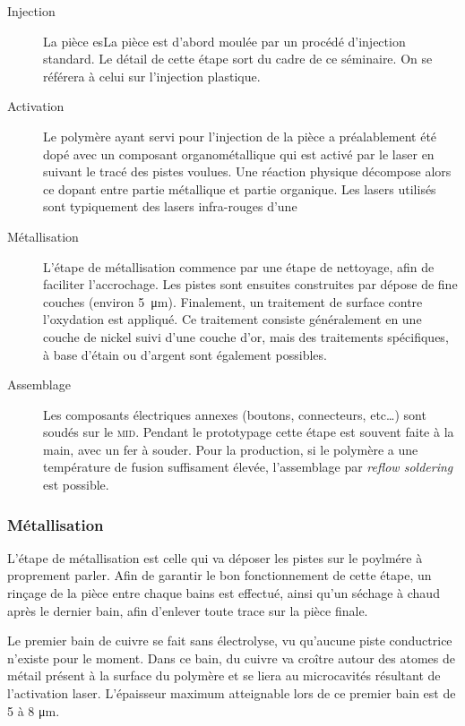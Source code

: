 \begin{description}
    \item[Injection] La pièce esLa pièce est d'abord moulée par un procédé d'injection standard.
        Le détail de cette étape sort du cadre de ce séminaire.
        On se référera à celui sur l'injection plastique.

    \item[Activation] Le polymère ayant servi pour l'injection de la pièce a préalablement été dopé avec un composant organométallique qui est activé par le laser en suivant le tracé des pistes voulues.
        Une réaction physique décompose alors ce dopant entre partie métallique et partie organique.
    Les lasers utilisés sont typiquement des lasers infra-rouges d'une \item[Métallisation] L'étape de métallisation commence par une étape de nettoyage, afin de faciliter l'accrochage.
        Les pistes sont ensuites construites par dépose de fine couches (environ \SI{5}{\micro\meter}).
        Finalement, un traitement de surface contre l'oxydation est appliqué.
        Ce traitement consiste généralement en une couche de nickel suivi d'une couche d'or, mais des traitements spécifiques, à base d'étain ou d'argent sont également possibles.
    \item[Assemblage] Les composants électriques annexes (boutons, connecteurs, etc\ldots) sont soudés sur le \textsc{mid}.
        Pendant le prototypage cette étape est souvent faite à la main, avec un fer à souder.
        Pour la production, si le polymère a une température de fusion suffisament élevée, l'assemblage par \emph{reflow soldering} est possible.

\end{description}

\subsubsection{Métallisation}
L'étape de métallisation est celle qui va déposer les pistes sur le poylmére à proprement parler.
Afin de garantir le bon fonctionnement de cette étape, un rinçage de la pièce entre chaque bains est effectué, ainsi qu'un séchage à chaud après le dernier bain, afin d'enlever toute trace sur la pièce finale.

Le premier bain de cuivre se fait sans électrolyse, vu qu'aucune piste conductrice n'existe pour le moment.
Dans ce bain, du cuivre va croître autour des atomes de métail présent à la surface du polymère et se liera au microcavités résultant de l'activation laser.
L'épaisseur maximum atteignable lors de ce premier bain est de 5 à 8 \si{\micro\meter}.

